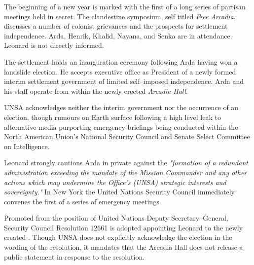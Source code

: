 

The beginning of a new year is marked with the first of a long series of partisan meetings held in secret. The clandestine symposium, self titled {\it Free Arcadia}, discusses a number of colonist grievances and the prospects for settlement independence. Arda, Henrik, Khalid, Nayana, and Senka are in attendance. Leonard is not directly informed.
\StopTimelineDate

The settlement holds an inauguration ceremony following Arda having won a landslide election. He accepts executive office as President of a newly formed interim settlement government of limited self--imposed independence. Arda and his staff operate from within the newly erected {\it Arcadia Hall}. 

UNSA acknowledges neither the interim government nor the occurrence of an election, though rumours on Earth surface following a high level leak to alternative media purporting emergency briefings being conducted within the North American Union's National Security Council and Senate Select Committee on Intelligence.

Leonard strongly cautions Arda in private against the {\it "formation of a redundant administration exceeding the mandate of the Mission Commander and any other actions which may undermine the Office's (UNSA) strategic interests and sovereignty."} In New York the United Nations Security Council immediately convenes the first of a series of emergency meetings.
\StopTimelineDate

Promoted from the position of United Nations Deputy Secretary--General, Security Council Resolution 12661 is adopted appointing Leonard to the newly created . Though UNSA does not explicitly acknowledge the election in the wording of the resolution, it mandates that the  Arcadia Hall does not release a public statement in response to the resolution.
\StopTimelineDate

